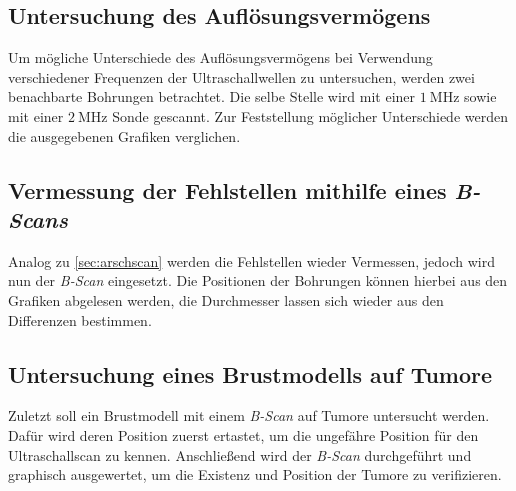 \subsection{Untersuchung des Auflösungsvermögens}
Um mögliche Unterschiede des Auflösungsvermögens bei Verwendung verschiedener Frequenzen der Ultraschallwellen
zu untersuchen, werden zwei benachbarte Bohrungen betrachtet. Die selbe Stelle wird mit einer $\qty{1}{\mega\hertz}$
sowie mit einer $\qty{2}{\mega\hertz}$ Sonde gescannt. Zur Feststellung möglicher Unterschiede werden die ausgegebenen
Grafiken verglichen.

\subsection{Vermessung der Fehlstellen mithilfe eines \textit{B-Scans}}
Analog zu \autoref{sec:arschscan} werden die Fehlstellen wieder Vermessen, jedoch
wird nun der \textit{B-Scan} eingesetzt. Die Positionen der Bohrungen können hierbei aus den Grafiken abgelesen werden,
die Durchmesser lassen sich wieder aus den Differenzen bestimmen.

\subsection{Untersuchung eines Brustmodells auf Tumore}
Zuletzt soll ein Brustmodell mit einem \textit{B-Scan} auf Tumore untersucht werden. Dafür wird deren Position
zuerst ertastet, um die ungefähre Position für den Ultraschallscan zu kennen.
Anschließend wird der \textit{B-Scan} durchgeführt und graphisch ausgewertet, um die Existenz und Position
der Tumore zu verifizieren.